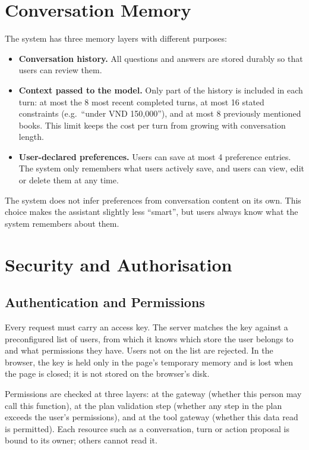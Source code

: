 \section{Conversation Memory}

The system has three memory layers with different purposes:

\begin{itemize}
    \item \textbf{Conversation history.} All questions and answers are stored durably so that users can review them.
    \item \textbf{Context passed to the model.} Only part of the history is included in each turn: at most the 8 most recent completed turns, at most 16 stated constraints (e.g.\ ``under VND 150,000''), and at most 8 previously mentioned books. This limit keeps the cost per turn from growing with conversation length.
    \item \textbf{User-declared preferences.} Users can save at most 4 preference entries. The system only remembers what users actively save, and users can view, edit or delete them at any time.
\end{itemize}

The system does not infer preferences from conversation content on its own. This choice makes the assistant slightly less ``smart'', but users always know what the system remembers about them.

\section{Security and Authorisation}

\subsection{Authentication and Permissions}

Every request must carry an access key. The server matches the key against a preconfigured list of users, from which it knows which store the user belongs to and what permissions they have. Users not on the list are rejected. In the browser, the key is held only in the page's temporary memory and is lost when the page is closed; it is not stored on the browser's disk.

Permissions are checked at three layers: at the gateway (whether this person may call this function), at the plan validation step (whether any step in the plan exceeds the user's permissions), and at the tool gateway (whether this data read is permitted). Each resource such as a conversation, turn or action proposal is bound to its owner; others cannot read it.

